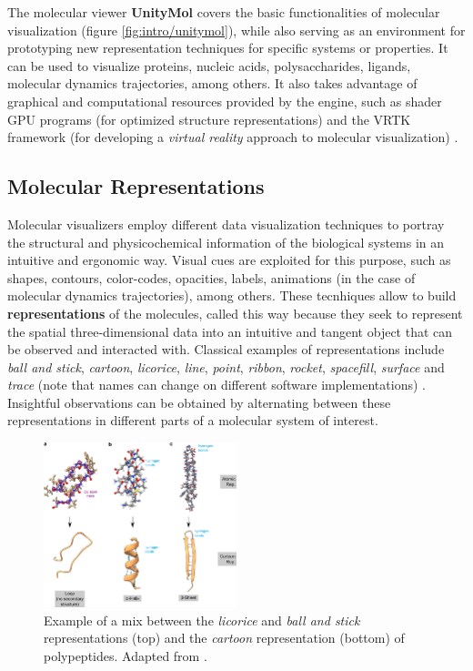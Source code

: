     The molecular viewer \textbf{UnityMol} covers the basic functionalities of molecular visualization (figure \ref{fig:intro/unitymol}), while also serving as an environment for prototyping new representation techniques for specific systems or properties. It can be used to visualize proteins, nucleic acids, polysaccharides, ligands, molecular dynamics trajectories, among others. It also takes advantage of graphical and computational resources provided by the engine, such as shader GPU programs (for optimized structure representations) and the VRTK framework (for developing a \textit{virtual reality} approach to molecular visualization) \cite{unitymol_2015, unitymol_web}.

  \subsection{Molecular Representations}
    Molecular visualizers employ different data visualization techniques to portray the structural and physicochemical information of the biological systems in an intuitive and ergonomic way. Visual cues are exploited for this purpose, such as shapes, contours, color-codes, opacities, labels, animations (in the case of molecular dynamics trajectories), among others. These tecnhiques allow to build \textbf{representations} of the molecules, called this way because they seek to represent the spatial three-dimensional data into an intuitive and tangent object that can be observed and interacted with. Classical examples of representations include \textit{ball and stick}, \textit{cartoon}, \textit{licorice}, \textit{line}, \textit{point}, \textit{ribbon}, \textit{rocket}, \textit{spacefill}, \textit{surface} and \textit{trace} (note that names can change on different software implementations) \cite{representations_web}. Insightful observations can be obtained by alternating between these representations in different parts of a molecular system of interest.

    \begin{figure}[H]
      \centering
      \includegraphics[width=0.5\textwidth]{figures/intro/rep_cartoon.png}
      \caption{\label{fig:intro/rep_cartoon} Example of a mix between the \textit{licorice} and \textit{ball and stick} representations (top) and the \textit{cartoon} representation (bottom) of polypeptides. Adapted from \cite{representations_2021}.}
    \end{figure}

